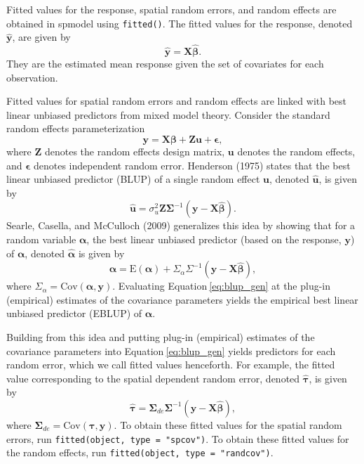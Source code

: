 \documentclass{article}
\begin{document}
Fitted values for the response, spatial random errors, and random
effects are obtained in spmodel using \texttt{fitted()}. The fitted
values for the response, denoted \(\mathbf{\hat{y}}\), are given by
\begin{equation}\label{eq:fit_resp}
  \mathbf{\hat{y}} = \mathbf{X} \bm{\hat{\beta}} .
\end{equation} They are the estimated mean response given the set of
covariates for each observation.

Fitted values for spatial random errors and random effects are linked
with best linear unbiased predictors from mixed model theory. Consider
the standard random effects parameterization \begin{equation}
  \mathbf{y} = \mathbf{X} \bm{\beta} + \mathbf{Z} \mathbf{u} + \bm{\epsilon},
\end{equation} where \(\mathbf{Z}\) denotes the random effects design
matrix, \(\mathbf{u}\) denotes the random effects, and \(\bm{\epsilon}\)
denotes independent random error. Henderson (1975) states that the best
linear unbiased predictor (BLUP) of a single random effect
\(\mathbf{u}\), denoted \(\mathbf{\hat{u}}\), is given by
\begin{equation}\label{eq:blup_mm}
  \mathbf{\hat{u}} = \sigma^2_u \mathbf{Z} \mathbf{\Sigma}^{-1}(\mathbf{y} - \mathbf{X} \bm{\hat{\beta}}).
\end{equation} Searle, Casella, and McCulloch (2009) generalizes this
idea by showing that for a random variable \(\bm{\alpha}\), the best
linear unbiased predictor (based on the response, \(\mathbf{y}\)) of
\(\mathbf{\alpha}\), denoted \(\bm{\hat{\alpha}}\) is given by
\begin{equation}\label{eq:blup_gen}
  \bm{\hat{\alpha}} = \text{E}(\bm{\alpha}) + \Sigma_\alpha \Sigma^{-1}(\mathbf{y} - \mathbf{X} \bm{\hat{\beta}}),
\end{equation} where
\(\Sigma_\alpha = \text{Cov}(\bm{\alpha}, \mathbf{y})\). Evaluating
Equation\(~\)\eqref{eq:blup_gen} at the plug-in (empirical) estimates of
the covariance parameters yields the empirical best linear unbiased
predictor (EBLUP) of \(\bm{\alpha}\).

Building from this idea and putting plug-in (empirical) estimates of the
covariance parameters into Equation\(~\)\eqref{eq:blup_gen} yields
predictors for each random error, which we call fitted values
henceforth. For example, the fitted value corresponding to the spatial
dependent random error, denoted \(\bm{\hat{\tau}}\), is given by
\begin{equation}\label{eq:blup_sp}
  \bm{\hat{\tau}} = \mathbf{\Sigma}_{de} \mathbf{\Sigma}^{-1}(\mathbf{y} - \mathbf{X} \bm{\hat{\beta}}),
\end{equation} where
\(\mathbf{\Sigma}_{de} = \text{Cov}(\bm{\tau}, \mathbf{y})\). To obtain
these fitted values for the spatial random errors, run
\texttt{fitted(object,\ type\ =\ "spcov")}. To obtain these fitted
values for the random effects, run
\texttt{fitted(object,\ type\ =\ "randcov")}.
\end{document}
